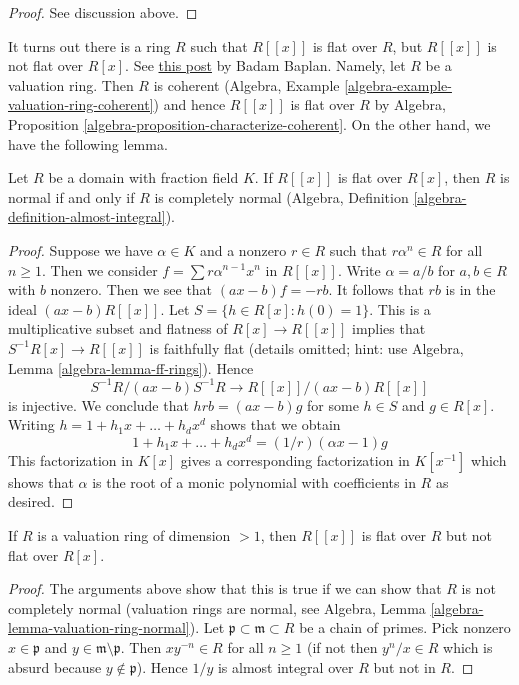 \begin{proof}
See discussion above.
\end{proof}

\noindent
It turns out there is a ring $R$ such that $R[[x]]$ is flat
over $R$, but $R[[x]]$ is not flat over $R[x]$. See
\href{https://math.stackexchange.com/users/164860/badam-baplan}{this post}
by Badam Baplan. Namely, let
$R$ be a valuation ring. Then $R$ is coherent (Algebra, Example
\ref{algebra-example-valuation-ring-coherent}) and hence
$R[[x]]$ is flat over $R$ by 
Algebra, Proposition \ref{algebra-proposition-characterize-coherent}.
On the other hand, we have the following lemma.

\begin{lemma}
\label{lemma-almost-integral-when-powerseries-flat}
Let $R$ be a domain with fraction field $K$.
If $R[[x]]$ is flat over $R[x]$, then $R$ is normal if and only
if $R$ is completely normal
(Algebra, Definition \ref{algebra-definition-almost-integral}).
\end{lemma}

\begin{proof}
Suppose we have $\alpha \in K$ and a nonzero $r \in R$ such that
$r \alpha^n \in R$ for all $n \geq 1$. Then we consider
$f = \sum r \alpha^{n - 1} x^n$ in $R[[x]]$. Write $\alpha = a/b$
for $a, b \in R$ with $b$ nonzero. Then we see that $(a x - b)f = -rb$.
It follows that $rb$ is in the ideal $(ax - b)R[[x]]$.
Let $S = \{h \in R[x] : h(0) = 1\}$. This is a multiplicative subset
and flatness of $R[x] \to R[[x]]$ implies that $S^{-1}R[x] \to R[[x]]$
is faithfully flat (details omitted; hint: use Algebra, Lemma
\ref{algebra-lemma-ff-rings}). Hence
$$
S^{-1}R/(ax - b)S^{-1}R \to R[[x]]/(ax - b)R[[x]]
$$
is injective. We conclude that
$h rb = (ax - b) g$ for some $h \in S$ and $g \in R[x]$.
Writing $h = 1 + h_1 x + \ldots + h_d x^d$ shows that we obtain
$$
1 + h_1 x + \ldots + h_d x^d = (1/r)(\alpha x - 1)g
$$
This factorization in $K[x]$ gives a corresponding factorization
in $K[x^{-1}]$ which shows that $\alpha$ is the root of a monic
polynomial with coefficients in $R$ as desired.
\end{proof}

\begin{lemma}
\label{lemma-completion-polynomial-ring-not-flat-bis}
If $R$ is a valuation ring of dimension $> 1$, then $R[[x]]$
is flat over $R$ but not flat over $R[x]$.
\end{lemma}

\begin{proof}
The arguments above show that this is true if we can show that
$R$ is not completely normal (valuation rings are
normal, see Algebra, Lemma \ref{algebra-lemma-valuation-ring-normal}).
Let $\mathfrak p \subset \mathfrak m \subset R$ be a chain of primes.
Pick nonzero $x \in \mathfrak p$ and $y \in \mathfrak m \setminus \mathfrak p$.
Then $x y^{-n} \in R$ for all $n \geq 1$ (if not then $y^n/x \in R$
which is absurd because $y \not \in \mathfrak p$). Hence $1/y$ is
almost integral over $R$ but not in $R$.
\end{proof}


